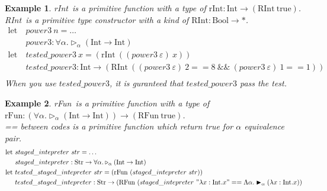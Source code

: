 \documentclass[9pt, a4paper]{extarticle}
\theoremstyle{break}
\newtheorem{ex}{Example}
\newcommand{\TW}{\triangleright}
\newcommand{\TB}{\blacktriangleright}
\begin{document}
	\begin{ex}
		\newcommand{\I}{\textrm{Int}}
		\newcommand{\B}{\textrm{Bool}}
		\newcommand{\RI}{\textrm{RInt}}
		\newcommand{\rI}{\textrm{rInt}}
		\rI\ is a primitive function with a type of $\rI : \I \to (\RI\ \text{true})$.\\
		\RI\ is a primitive type constructor with a kind of $\RI : \B \to *$.
		\begin{align*}
			\text{let}\  & power3\ n = \hdots                                                                                  \\
			             & power3 : \forall\alpha. \TW_\alpha(\I \to \I)                                                       \\
			\text{let}\  & tested\_power3\ x = (\rI\ ((power3\ \varepsilon)\ x))                                               \\
			             & tested\_power3 : \I \to (\RI\ ((power3\ \varepsilon)\ 2 == 8\ \&\&\ (power3\ \varepsilon)\ 1 == 1)) \\
		\end{align*}
		When you use $tested\_power3$, it is guranteed that $tested\_power3$ pass the test.
	\end{ex}

	\begin{ex}
		\newcommand{\I}{\textrm{Int}}
		\newcommand{\Exp}{\textrm{Str}}
		\newcommand{\RI}{\textrm{RFun}}
		\newcommand{\rI}{\textrm{rFun}}
		\rI\ is a primitive function with a type of $\rI : (\forall\alpha.\TW_\alpha(\I \to \I)) \to (\RI\ \text{true})$.\\
		== between codes is a primitive function which return true for $\alpha$ equivalence pair.
		\begin{align*}
			\text{let}\  & staged\_intepreter\ str = \hdots                                                                                                \\
			             & staged\_intepreter : \Exp \to \forall\alpha.\TW_\alpha(\I \to \I)                                                               \\
			\text{let}\  & tested\_staged\_intepreter\ str = (\rI\ (staged\_intepreter\ str))                                                              \\
			             & tested\_staged\_intepreter : \Exp \to (\RI\ (staged\_intepreter\ "\lambda x:\I.x" == \Lambda\alpha.\TB_\alpha (\lambda x:\I.x)) \\
		\end{align*}
	\end{ex}
\end{document}

